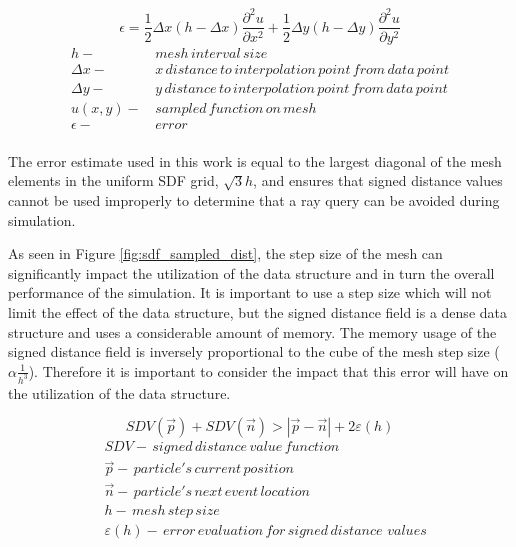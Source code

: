\begin{equation}
    \epsilon = \frac{1}{2} \Delta x (h-\Delta x) \frac{\partial^2 u}{\partial x^2} + \frac{1}{2} \Delta y (h-\Delta y)  \frac{\partial^2 u}{\partial y^2}
\end{equation}
  \begin{align*}
    h - & \, mesh\, interval\, size \\
    \Delta x - & \, x\, distance\, to\, interpolation\, point\, from\, data\, point \\
    \Delta y - & \, y\, distance\, to\, interpolation\, point\, from\, data\, point \\
    u(x,y) - &\, sampled\, function\, on\, mesh \\
    \epsilon - & \, error \\
  \end{align*}
  \label{eq:interpolation_err_2d}

The error estimate used in this work is equal to the largest diagonal of the
mesh elements in the uniform SDF grid, $\sqrt{3}h$, and ensures that signed
distance values cannot be used improperly to determine that a ray query can be
avoided during simulation.


As seen in Figure \ref{fig:sdf_sampled_dist}, the step size of the mesh can
significantly impact the utilization of the data structure and in turn the
overall performance of the simulation. It is important to use a step size which
will not limit the effect of the data structure, but the signed
distance field is a dense data structure and uses a considerable amount of
memory. The memory usage of the signed distance field is inversely proportional
to the cube of the mesh step size ($\alpha \frac{1}{h^{3}}$). Therefore it is
important to consider the impact that this error will have on the utilization
of the data structure.

\begin{equation}
  SDV(\vec{p}) + SDV(\vec{n}) > |\vec{p}-\vec{n}| + 2\varepsilon(h)
  \label{eq:condition}
\end{equation}
\begin{align*}
 &SDV - \, signed \, distance \, value \, function \\
 &\vec{p} - \, particle's \, current \, position \\
 &\vec{n} - \, particle's \, next \, event \, location \\
 &h - \, mesh \, step \, size \\
 &\varepsilon(h) - \, error \, evaluation \, for \, signed \, distance \, \, values \\
\end{align*}


